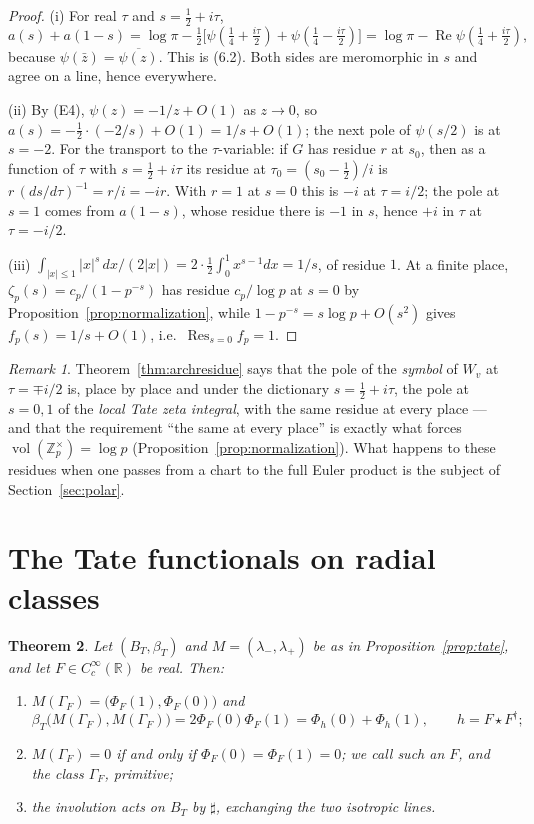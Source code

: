 \documentclass[11pt]{amsart}
\newtheorem{theorem}{Theorem}[section]
\theoremstyle{definition}
\theoremstyle{remark}
\newtheorem{remark}[theorem]{Remark}
\newcommand{\R}{\mathbb R}
\newcommand{\Z}{\mathbb Z}
\newcommand{\Rel}{\operatorname{Re}}
\newcommand{\Res}{\operatorname*{Res}}
\newcommand{\vol}{\operatorname{vol}}
\newcommand{\BT}{B_T}
\begin{document}
\begin{proof}
(i)  For real $\tau$ and $s=\tfrac12+i\tau$,
\[
  a(s)+a(1-s)=\log\pi-\tfrac12\bigl[\psi(\tfrac14+\tfrac{i\tau}2)
  +\psi(\tfrac14-\tfrac{i\tau}2)\bigr]
  =\log\pi-\Rel\psi(\tfrac14+\tfrac{i\tau}2),
\]
because $\psi(\bar z)=\overline{\psi(z)}$.  This is (6.2).  Both sides are
meromorphic in $s$ and agree on a line, hence everywhere.

(ii)  By (E4), $\psi(z)=-1/z+O(1)$ as $z\to0$, so
$a(s)=-\tfrac12\cdot(-2/s)+O(1)=1/s+O(1)$; the next pole of $\psi(s/2)$ is at
$s=-2$.  For the transport to the $\tau$-variable: if $G$ has residue $r$ at
$s_0$, then as a function of $\tau$ with $s=\tfrac12+i\tau$ its residue at
$\tau_0=(s_0-\tfrac12)/i$ is $r\,(ds/d\tau)^{-1}=r/i=-ir$.  With $r=1$ at
$s=0$ this is $-i$ at $\tau=i/2$; the pole at $s=1$ comes from $a(1-s)$, whose
residue there is $-1$ in $s$, hence $+i$ in $\tau$ at $\tau=-i/2$.

(iii)  $\int_{|x|\le1}|x|^s\,dx/(2|x|)=2\cdot\tfrac12\int_0^1x^{s-1}dx=1/s$,
of residue $1$.  At a finite place,
$\zeta_p(s)=c_p/(1-p^{-s})$ has residue $c_p/\log p$ at $s=0$ by
Proposition~\ref{prop:normalization}, while
$1-p^{-s}=s\log p+O(s^2)$ gives $f_p(s)=1/s+O(1)$, i.e.\ $\Res_{s=0}f_p=1$.
\end{proof}

\begin{remark}
\label{rem:onepole}
Theorem~\ref{thm:archresidue} says that the pole of the \emph{symbol} of $W_v$
at $\tau=\mp i/2$ is, place by place and under the dictionary
$s=\tfrac12+i\tau$, the pole at $s=0,1$ of the \emph{local Tate zeta integral},
with the same residue at every place --- and that the requirement ``the same at
every place'' is exactly what forces $\vol(\Z_p^\times)=\log p$
(Proposition~\ref{prop:normalization}).  What happens to these residues when
one passes from a chart to the full Euler product is the subject of
Section~\ref{sec:polar}.
\end{remark}

\section{The Tate functionals on radial classes}
\label{sec:boundary}

\begin{theorem}
\label{thm:polarpacket}
Let $(\BT,\beta_T)$ and $M=(\lambda_-,\lambda_+)$ be as in
Proposition~\emph{\ref{prop:tate}}, and let $F\in C_c^\infty(\R)$ be real.
Then:
\begin{enumerate}
\item[(i)] $M(\Gamma_F)=\bigl(\Phi_F(1),\Phi_F(0)\bigr)$ and
\[
  \beta_T\bigl(M(\Gamma_F),M(\Gamma_F)\bigr)=2\Phi_F(0)\Phi_F(1)
  =\Phi_h(0)+\Phi_h(1),\qquad h=F\star F^\dagger ;
\]
\item[(ii)] $M(\Gamma_F)=0$ if and only if $\Phi_F(0)=\Phi_F(1)=0$; we call
such an $F$, and the class $\Gamma_F$, \emph{primitive};
\item[(iii)] the involution acts on $\BT$ by $\sharp$, exchanging the two
isotropic lines.
\end{enumerate}
\end{theorem}
\end{document}
